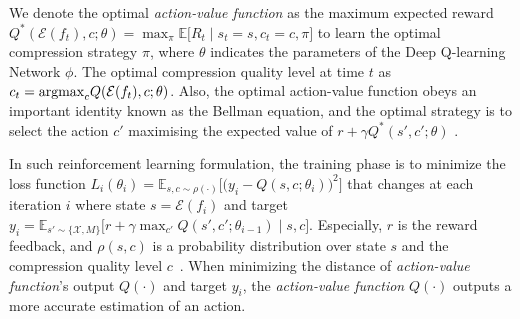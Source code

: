 {\color{revise3} We denote the optimal \emph{action-value function} as the maximum expected reward $ Q^{*}(\mathcal{E}(f_t), c; \theta) = \max_{\pi} \mathbb{E} \big[R_t \mid s_t=s,c_t=c,\pi\big]$ to learn the optimal compression strategy $\pi$, where $ \theta $ indicates the parameters of the Deep Q-learning Network $ \phi $. The optimal compression quality level at time $ t $ as $  c_t = {\rm argmax}_cQ(\mathcal{E}(f_t), c; \theta) $. Also, the optimal action-value function obeys an important identity known as the Bellman equation, and the optimal strategy is to select the action $c'$ maximising the expected value of $r + \gamma Q^{*}(s', c'; \theta) $ \cite{DQN}.}

	

In such reinforcement learning formulation, the training phase is to minimize the loss function $ L_i(\theta_i) = \mathbb{E}_{s, c \sim \rho (\cdot)}\Big[\big(y_i - Q(s, c; \theta_i)\big)^2 \Big] $ that changes at each iteration $ i $ where {\color{revise2} state $ s = \mathcal{E}(f_i) $} and target $ y_i = \mathbb{E}_{s' \sim \{\mathcal{X}, M\}} \big[ r + \gamma \max_{c'} Q(s', c'; \theta_{i-1}) \mid s, c \big] $. Especially, $ r $ is the reward feedback, and $ \rho(s, c) $ is a probability distribution over {\color{revise2} state} $ s $ and the compression quality level $ c $~\cite{DQN}. When minimizing the distance of \emph{action-value function}'s output $ Q(\cdot) $ and target $ y_i $, the \emph{action-value function} $ Q(\cdot) $ outputs a more accurate estimation of an action. 

